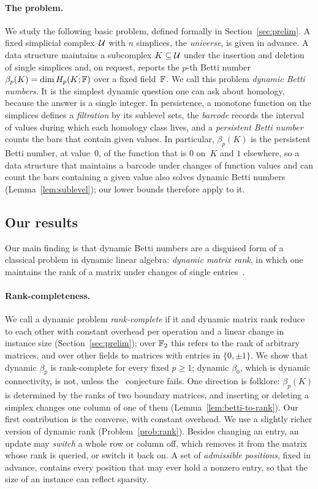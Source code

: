 \paragraph{The problem.}
We study the following basic problem, defined formally in Section~\ref{sec:prelim}.
A fixed simplicial complex~$\mathcal{U}$ with $n$ simplices, the \emph{universe}, is given in advance.
A data structure maintains a subcomplex $K\subseteq\mathcal{U}$ under the insertion and deletion of single simplices and, on request, reports the $p$-th Betti number $\beta_p(K)=\dim H_p(K;\mathbb{F})$ over a fixed field~$\mathbb{F}$.
We call this problem \emph{dynamic Betti numbers}.
It is the simplest dynamic question one can ask about homology, because the answer is a single integer.
In persistence, a monotone function on the simplices defines a \emph{filtration} by its sublevel sets, the \emph{barcode} records the interval of values during which each homology class lives, and a \emph{persistent Betti number} counts the bars that contain given values.
In particular, $\beta_p(K)$ is the persistent Betti number, at value~$0$, of the function that is $0$ on~$K$ and $1$ elsewhere, so a data structure that maintains a barcode under changes of function values and can count the bars containing a given value also solves dynamic Betti numbers (Lemma~\ref{lem:sublevel}); our lower bounds therefore apply to it.

\subsection{Our results}

Our main finding is that dynamic Betti numbers are a disguised form of a classical problem in dynamic linear algebra: \emph{dynamic matrix rank}, in which one maintains the rank of a matrix under changes of single entries~\cite{FF09,San07,vdBNS19}.

\paragraph{Rank-completeness.}
We call a dynamic problem \emph{rank-complete} if it and dynamic matrix rank reduce to each other with constant overhead per operation and a linear change in instance size (Section~\ref{sec:prelim}); over $\mathbb{F}_2$ this refers to the rank of arbitrary matrices, and over other fields to matrices with entries in $\{0,\pm1\}$.
We show that dynamic $\beta_p$ is rank-complete for every fixed $p\ge1$; dynamic $\beta_0$, which is dynamic connectivity, is not, unless the \OMv\ conjecture fails.
One direction is folklore: $\beta_p(K)$ is determined by the ranks of two boundary matrices, and inserting or deleting a simplex changes one column of one of them (Lemma~\ref{lem:betti-to-rank}).
Our first contribution is the converse, with constant overhead.
We use a slightly richer version of dynamic rank (Problem~\ref{prob:rank}).
Besides changing an entry, an update may \emph{switch} a whole row or column off, which removes it from the matrix whose rank is queried, or switch it back on.
A set of \emph{admissible positions}, fixed in advance, contains every position that may ever hold a nonzero entry, so that the size of an instance can reflect sparsity.

